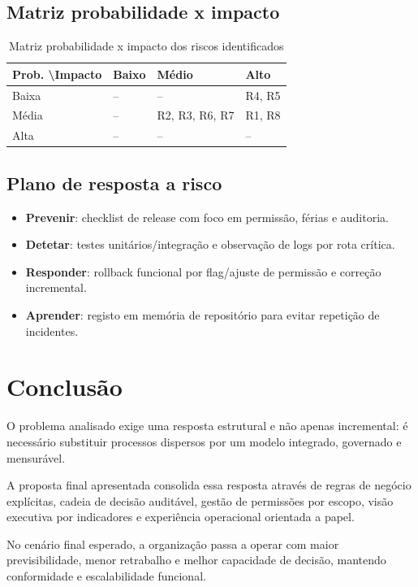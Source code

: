 \documentclass[11pt,a4paper]{article}
\begin{document}
\subsection{Matriz probabilidade x impacto}
\begin{table}[h]
\centering
\begin{tabular}{p{2.8cm} p{3.5cm} p{3.5cm} p{3.5cm}}
\toprule
\textbf{Prob. \textbackslash Impacto} & \textbf{Baixo} & \textbf{Médio} & \textbf{Alto} \\
\midrule
Baixa & -- & -- & R4, R5 \\
Média & -- & R2, R3, R6, R7 & R1, R8 \\
Alta & -- & -- & -- \\
\bottomrule
\end{tabular}
\caption{Matriz probabilidade x impacto dos riscos identificados}
\label{tab:risk-matrix}
\end{table}

\subsection{Plano de resposta a risco}
\begin{itemize}
  \item \textbf{Prevenir}: checklist de release com foco em permissão, férias e auditoria.
  \item \textbf{Detetar}: testes unitários/integração e observação de logs por rota crítica.
  \item \textbf{Responder}: rollback funcional por flag/ajuste de permissão e correção incremental.
  \item \textbf{Aprender}: registo em memória de repositório para evitar repetição de incidentes.
\end{itemize}

\section{Conclusão}
O problema analisado exige uma resposta estrutural e não apenas incremental: é necessário substituir processos dispersos por um modelo integrado, governado e mensurável.

A proposta final apresentada consolida essa resposta através de regras de negócio explícitas, cadeia de decisão auditável, gestão de permissões por escopo, visão executiva por indicadores e experiência operacional orientada a papel.

No cenário final esperado, a organização passa a operar com maior previsibilidade, menor retrabalho e melhor capacidade de decisão, mantendo conformidade e escalabilidade funcional.
\end{document}
